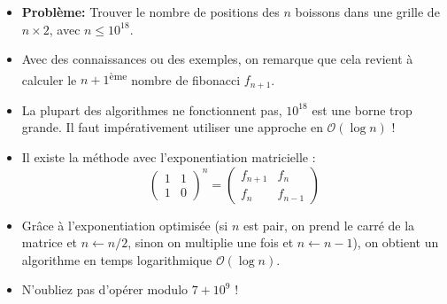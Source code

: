 \begin{frame}
    \frametitle{\problemtitle}
    \begin{itemize}
        \item<+-> \textbf{Problème:} Trouver le nombre de positions des $n$ boissons dans une grille de $n\times 2$, avec $n \le 10^{18}$.
        \item<+-> Avec des connaissances ou des exemples, on remarque que cela revient à calculer le $n+1$\textsuperscript{ème} nombre de fibonacci $f_{n+1}$.
        \item<+-> La plupart des algorithmes ne fonctionnent pas, $10^{18}$ est une borne trop grande. Il faut impérativement utiliser une approche en $\mathcal{O}(\log n)$ !
        \item<+-> Il existe la méthode avec l'exponentiation matricielle :
        \[
        \begin{pmatrix}
        1 & 1\\
        1 & 0
        \end{pmatrix}^n =
        \begin{pmatrix}
        f_{n+1} & f_{n}\\
        f_{n} & f_{n-1}
        \end{pmatrix}
        \]
        \item<+-> Grâce à l'exponentiation optimisée (si $n$ est pair, on prend le carré de la matrice et $n\leftarrow n/2$, sinon on multiplie une fois et $n\leftarrow n-1$), on obtient un algorithme en temps logarithmique $\mathcal{O}(\log n)$.
        \item<+-> N'oubliez pas d'opérer modulo $7+10^9$ !
    \end{itemize}
    \solvestats
\end{frame}
